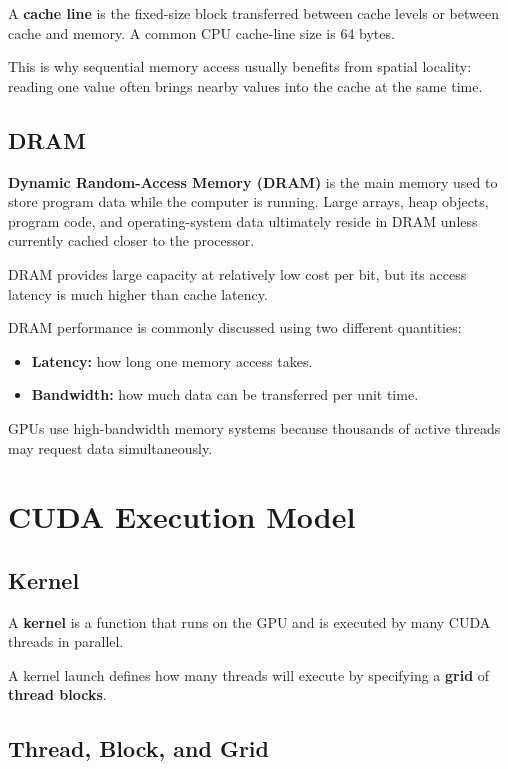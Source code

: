 \documentclass[11pt,a4paper]{article}
\begin{document}
A \textbf{cache line} is the fixed-size block transferred between cache levels or between cache and memory. A common CPU cache-line size is 64 bytes.

This is why sequential memory access usually benefits from spatial locality: reading one value often brings nearby values into the cache at the same time.

\subsection{DRAM}

\textbf{Dynamic Random-Access Memory (DRAM)} is the main memory used to store program data while the computer is running. Large arrays, heap objects, program code, and operating-system data ultimately reside in DRAM unless currently cached closer to the processor.

DRAM provides large capacity at relatively low cost per bit, but its access latency is much higher than cache latency.

DRAM performance is commonly discussed using two different quantities:

\begin{itemize}
    \item \textbf{Latency:} how long one memory access takes.
    \item \textbf{Bandwidth:} how much data can be transferred per unit time.
\end{itemize}

GPUs use high-bandwidth memory systems because thousands of active threads may request data simultaneously.

\section{CUDA Execution Model}

\subsection{Kernel}

A \textbf{kernel} is a function that runs on the GPU and is executed by many CUDA threads in parallel.

A kernel launch defines how many threads will execute by specifying a \textbf{grid} of \textbf{thread blocks}.

\subsection{Thread, Block, and Grid}
\end{document}
